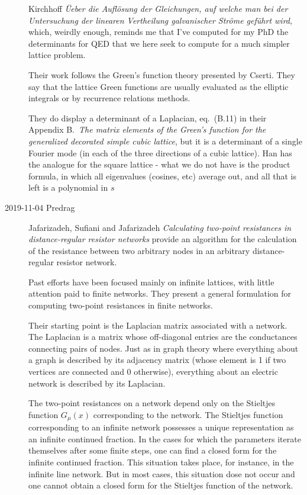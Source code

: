 \begin{description}
Kirchhoff {\em {\"U}eber die Aufl{\"o}sung der
Gleichungen, auf welche man bei der Untersuchung der linearen Vertheilung
galvanischer Str{\"o}me gef{\"u}hrt wird}, which, weirdly enough, reminds
me that I've computed for my PhD the determinants for QED
that we here seek to compute for a much simpler lattice problem.

Their work follows the Green's function theory presented by
Cserti. They say that the lattice Green functions are
usually evaluated as the elliptic integrals  or by
recurrence relations methods.

They do display a determinant of a Laplacian, eq.~(B.11) in their Appendix
B.~{\em The matrix elements of the Green's function for the generalized
decorated simple cubic lattice}, but it is a determinant of a
single Fourier mode (in each of the three directions of a cubic lattice). Han
has the analogue for the square lattice - what we do not have is the
product formula, in which all eigenvalues (cosines, etc) average out, and
all that is left is a polynomial in $s$

\item[2019-11-04 Predrag]
Jafarizadeh, Sufiani and Jafarizadeh {\em Calculating
two-point resistances in distance-regular resistor networks}
provide an algorithm for the calculation of the resistance between two
arbitrary nodes in an arbitrary distance-regular resistor network.

Past efforts have been focused mainly on infinite lattices, with little
attention paid to finite networks. They present a general formulation for
computing two-point resistances in finite networks.

Their starting point is the Laplacian matrix associated with a network.
The Laplacian is a matrix whose off-diagonal entries are the conductances
connecting pairs of nodes. Just as in graph theory where everything about
a graph is described by its adjacency matrix (whose element is 1 if two
vertices are connected and 0 otherwise), everything about an electric
network is described by its Laplacian.

The two-point resistances on a network depend only on the Stieltjes
function $G_\mu(x)$ corresponding to the network. The Stieltjes function
corresponding to an infinite network possesses a unique representation as
an infinite continued fraction. In the cases for which the parameters
iterate themselves after some finite steps, one can find a closed form
for the infinite continued fraction. This situation takes place, for
instance, in the infinite line network. But in most cases, this situation
dose not occur and one cannot obtain a closed form for the Stieltjes
function of the network.


\end{description}
